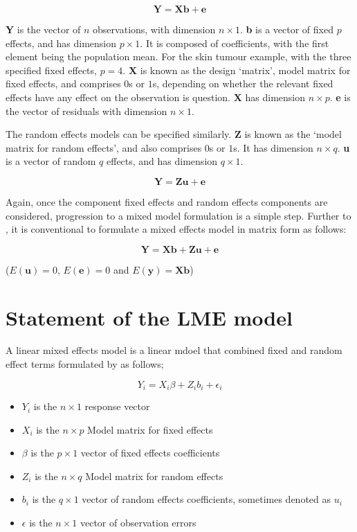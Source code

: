 \documentclass[MAIN.tex]{subfiles}
\begin{document}
\begin{equation}
\textbf{Y} = \textbf{Xb} + \textbf{e}
\end{equation}

\textbf{Y} is the vector of $n$ observations, with dimension $n
\times 1$. \textbf{b} is a vector of fixed $p$ effects, and has
dimension $p \times 1$. It is composed of coefficients, with the
first element being the population mean. For the skin tumour
example, with the three specified fixed effects, $p=4$. \textbf{X}
is known as the design `matrix', model matrix for fixed effects,
and comprises $0$s or $1$s, depending on whether the relevant
fixed effects have any effect on the observation is question.
\textbf{X} has dimension $n \times p$. \textbf{e} is the vector of
residuals with dimension $n \times 1$.

The random effects models can be specified similarly. \textbf{Z}
is known as the `model matrix for random effects', and also
comprises $0$s or $1$s. It has dimension $n \times q$. \textbf{u}
is a vector of random $q$ effects, and has dimension $q \times 1$.

\begin{equation}
\textbf{Y} = \textbf{Zu} + \textbf{e}
\end{equation}

Again, once the component fixed effects and random effects
components are considered, progression to a mixed model
formulation is a simple step. Further to \citet{LW82}, it is
conventional to formulate a mixed effects model in matrix form as
follows:

\begin{equation}
\textbf{Y} = \textbf{Xb} + \textbf{Zu} + \textbf{e}
\end{equation}

($E(\textbf{u})=0$, $E(\textbf{e})=0 $ and $E(\textbf{y}) =
\textbf{Xb}$)

\section{Statement of the LME model}
A linear mixed effects model is a linear mdoel that combined fixed and random effect terms formulated by \citet{LW82} as follows;

\begin{displaymath}
Y_{i} =X_{i}\beta + Z_{i}b_{i} + \epsilon_{i}
\end{displaymath}
\begin{itemize}
	
	\item $Y_{i}$ is the $n \times 1$ response vector \item $X_{i}$ is
	the $n \times p$ Model matrix for fixed effects \item $\beta$ is
	the $p \times 1$ vector of fixed effects coefficients \item
	$Z_{i}$ is the $n \times q$ Model matrix for random effects \item
	$b_{i}$ is the $q \times 1$ vector of random effects coefficients,
	sometimes denoted as $u_{i}$ \item $\epsilon$ is the $n \times 1$
	vector of observation errors
\end{itemize}
\end{document}
